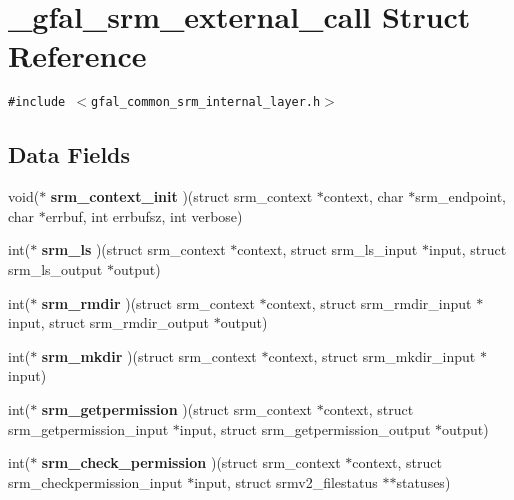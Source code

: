 \section{\_\-gfal\_\-srm\_\-external\_\-call Struct Reference}
\label{struct__gfal__srm__external__call}
{\tt \#include $<$gfal\_\-common\_\-srm\_\-internal\_\-layer.h$>$}

\subsection*{Data Fields}
\begin{CompactItemize}
\item 
void($\ast$ \textbf{srm\_\-context\_\-init} )(struct srm\_\-context $\ast$context, char $\ast$srm\_\-endpoint, char $\ast$errbuf, int errbufsz, int verbose)\label{struct__gfal__srm__external__call_c8feab1503dbbb4d457c5c008bf19c0c}

\item 
int($\ast$ \textbf{srm\_\-ls} )(struct srm\_\-context $\ast$context, struct srm\_\-ls\_\-input $\ast$input, struct srm\_\-ls\_\-output $\ast$output)\label{struct__gfal__srm__external__call_81ed6c9c2f289df212f857321e7e39d6}

\item 
int($\ast$ \textbf{srm\_\-rmdir} )(struct srm\_\-context $\ast$context, struct srm\_\-rmdir\_\-input $\ast$input, struct srm\_\-rmdir\_\-output $\ast$output)\label{struct__gfal__srm__external__call_26679171bd7306372dc4996881041f06}

\item 
int($\ast$ \textbf{srm\_\-mkdir} )(struct srm\_\-context $\ast$context, struct srm\_\-mkdir\_\-input $\ast$input)\label{struct__gfal__srm__external__call_7f69b2ce5e4c48d4c139f83173bc1141}

\item 
int($\ast$ \textbf{srm\_\-getpermission} )(struct srm\_\-context $\ast$context, struct srm\_\-getpermission\_\-input $\ast$input, struct srm\_\-getpermission\_\-output $\ast$output)\label{struct__gfal__srm__external__call_5d9566c51ae7e37e339dab73a6da8593}

\item 
int($\ast$ \textbf{srm\_\-check\_\-permission} )(struct srm\_\-context $\ast$context, struct srm\_\-checkpermission\_\-input $\ast$input, struct srmv2\_\-filestatus $\ast$$\ast$statuses)\label{struct__gfal__srm__external__call_2ace1e445ffd7f345b8b824d7a291873}


\end{CompactItemize}
